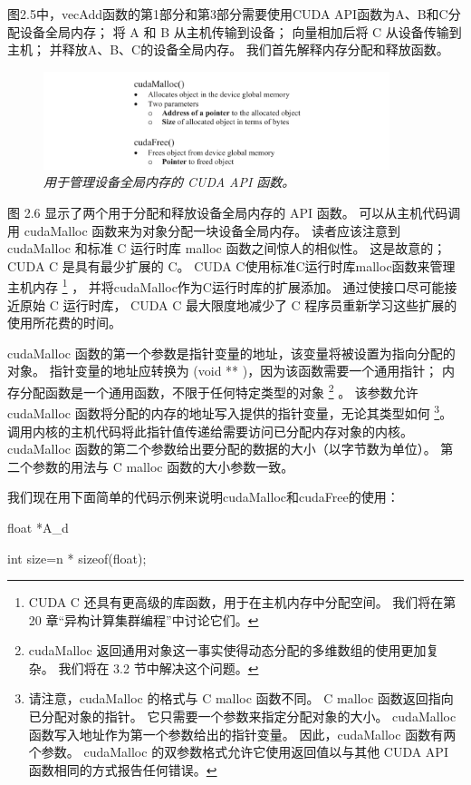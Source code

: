 图2.5中，vecAdd函数的第1部分和第3部分需要使用CUDA API函数为A、B和C分配设备全局内存； 
将 A 和 B 从主机传输到设备； 向量相加后将 C 从设备传输到主机； 并释放A、B、C的设备全局内存。
我们首先解释内存分配和释放函数。

\begin{figure}[H]
	\centering
	\includegraphics[width=0.9\textwidth]{figs/F2.6.png}
	\caption{\textit{用于管理设备全局内存的 CUDA API 函数。}}
\end{figure}

图 2.6 显示了两个用于分配和释放设备全局内存的 API 函数。 
可以从主机代码调用 cudaMalloc 函数来为对象分配一块设备全局内存。 
读者应该注意到 cudaMalloc 和标准 C 运行时库 malloc 函数之间惊人的相似性。 
这是故意的； CUDA C 是具有最少扩展的 C。 CUDA C使用标准C运行时库malloc函数来管理主机内存
\footnote{CUDA C 还具有更高级的库函数，用于在主机内存中分配空间。 我们将在第 20 章“异构计算集群编程”中讨论它们。} ，
并将cudaMalloc作为C运行时库的扩展添加。 通过使接口尽可能接近原始 C 运行时库，
CUDA C 最大限度地减少了 C 程序员重新学习这些扩展的使用所花费的时间。

cudaMalloc 函数的第一个参数是指针变量的地址，该变量将被设置为指向分配的对象。
指针变量的地址应转换为 (void ** )，因为该函数需要一个通用指针； 内存分配函数是一个通用函数，不限于任何特定类型的对象
\footnote{cudaMalloc 返回通用对象这一事实使得动态分配的多维数组的使用更加复杂。 我们将在 3.2 节中解决这个问题。} 。
该参数允许 cudaMalloc 函数将分配的内存的地址写入提供的指针变量，无论其类型如何
\footnote{请注意，cudaMalloc 的格式与 C malloc 函数不同。 C malloc 函数返回指向已分配对象的指针。 
它只需要一个参数来指定分配对象的大小。 cudaMalloc 函数写入地址作为第一个参数给出的指针变量。 
因此，cudaMalloc 函数有两个参数。 
cudaMalloc 的双参数格式允许它使用返回值以与其他 CUDA API 函数相同的方式报告任何错误。}。
调用内核的主机代码将此指针值传递给需要访问已分配内存对象的内核。 
cudaMalloc 函数的第二个参数给出要分配的数据的大小（以字节数为单位）。 
第二个参数的用法与 C malloc 函数的大小参数一致。

我们现在用下面简单的代码示例来说明cudaMalloc和cudaFree的使用：

float *A\_d 

int size=n * sizeof(float);

